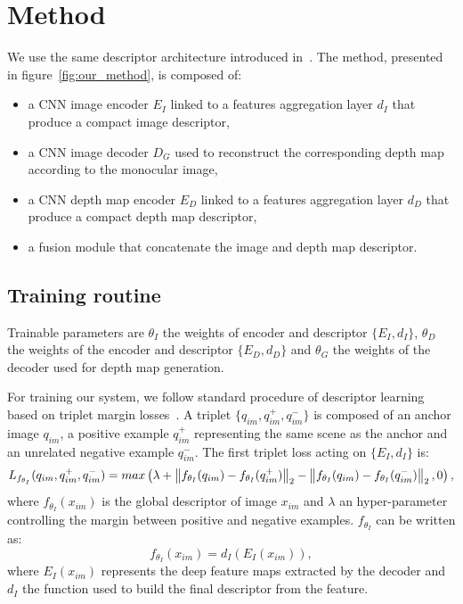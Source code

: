 \section{Method}
\label{sec:method}


%

We use the same descriptor architecture introduced in~\cite{Piasco2019}. The method, presented in figure~\ref{fig:our_method}, is composed of:

\begin{itemize}
	\item a CNN image encoder $E_I$ linked to a features aggregation layer $d_I$ that produce a compact image descriptor,
	\item a CNN image decoder $D_G$ used to reconstruct the corresponding depth map according to the monocular image,
	\item a CNN depth map encoder $E_D$ linked to a features aggregation layer $d_D$ that produce a compact depth map descriptor,
	\item a fusion module that concatenate the image and depth map descriptor.
\end{itemize}

\subsection{Training routine}
\label{subsec:training}
Trainable parameters are $\theta_{I}$ the weights of encoder and descriptor $\{E_I, d_I\}$, $\theta_{D}$ the weights of the encoder and descriptor $\{E_D, d_D\}$ and $\theta_{G}$ the weights of the decoder used for depth map generation. 

For training our system, we follow standard procedure of descriptor learning based on triplet margin losses~\cite{Arandjelovic2017}. A triplet $\{q_{im}, q_{im}^+, q_{im}^-\}$ is composed of an anchor image $q_{im}$, a positive example $q_{im}^+$ representing the same scene as the anchor and an unrelated negative example $q_{im}^-$.
The first triplet loss acting on $\{E_I, d_I\}$ is:
\begin{equation}
	\label{eq:triplet_loss}
	L_{f_{\theta_{I}}}(q_{im}, q_{im}^+, q_{im}^-) = max\left(\lambda + \left\lVert f_{\theta_{I}}(q_{im}) - f_{\theta_{I}}(q_{im}^+)\right\rVert_2 - \left\lVert f_{\theta_{I}}(q_{im}) - f_{\theta_{I}}(q_{im}^-)\right\rVert_2, 0 \right),
\end{equation}
where $f_{\theta_{I}}(x_{im})$ is the global descriptor of image $x_{im}$ and $\lambda$ an hyper-parameter controlling the margin between positive and negative examples. $f_{\theta_{I}}$ can be written as:
\begin{equation}
	\label{eq:desc_details}
	f_{\theta_{I}}(x_{im}) = d_I(E_I(x_{im})),
\end{equation}
where $E_I(x_{im})$ represents the deep feature maps extracted by the decoder and $d_I$ the function used to build the final descriptor from the feature.

